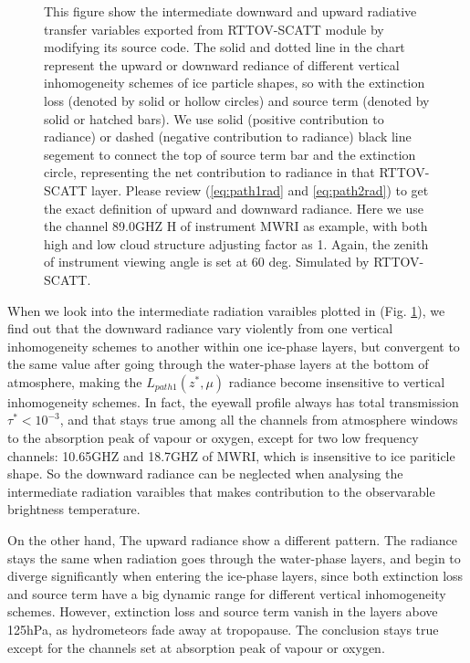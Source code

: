 \documentclass[a4paper]{report}
\begin{document}
\begin{figure}[hb] 
\centering
{}
\caption{This figure show the intermediate downward and upward radiative transfer variables 
exported from RTTOV-SCATT module by modifying its source code. 
The solid and dotted line in the chart represent the upward or downward rediance 
of different vertical inhomogeneity schemes of ice particle shapes, so with the extinction loss (denoted by solid or hollow circles)
and source term (denoted by solid or hatched bars).
We use solid (positive contribution to radiance) or dashed (negative contribution to radiance) black line segement 
to connect the top of source term bar and the extinction circle, representing the net contribution to radiance in that
RTTOV-SCATT layer. 
Please review (\ref{eq:path1rad} and \ref{eq:path2rad}) to get the exact definition of upward and downward radiance. 
Here we use the channel 89.0GHZ H of instrument MWRI as example, with both high and low cloud structure
adjusting factor as 1. Again, the zenith of instrument viewing angle is set at 60 deg. 
Simulated by RTTOV-SCATT.}
\label{fig:exrad}
\end{figure}

When we look into the intermediate radiation varaibles plotted in (Fig. \ref{fig:exrad}), we find out that the 
downward radiance vary violently from one vertical inhomogeneity schemes to another within one ice-phase layers, but convergent to 
the same value after going through the water-phase layers at the bottom of atmosphere, making the $L_{path1}(z^{*}, \mu)$ radiance 
become insensitive to vertical inhomogeneity schemes. In fact, the eyewall profile always has total transmission $\tau^{*} < 10^{-3}$, 
and that stays true among all the channels from atmosphere windows to the absorption peak of vapour or oxygen, except for 
two low frequency channels: 10.65GHZ and 18.7GHZ of MWRI, which is insensitive to ice pariticle shape. 
So the downward radiance can be neglected when analysing the intermediate radiation varaibles that makes contribution 
to the observarable brightness temperature.

On the other hand, The upward radiance show a different pattern. The radiance stays the same when radiation goes through the water-phase
layers, and begin to diverge significantly when entering the ice-phase layers, since both extinction loss and source term have a big
dynamic range for different vertical inhomogeneity schemes. However, extinction loss and source term vanish in the layers above 125hPa, 
as hydrometeors fade away at tropopause. The conclusion stays true except for the channels set at absorption peak of vapour or oxygen.
\end{document}
